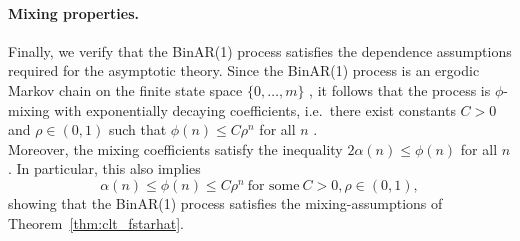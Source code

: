 ﻿\documentclass[12pt,a4paper]{scrreprt}
\theoremstyle{definition}
\begin{document}
\paragraph{Mixing properties.}
Finally, we verify that the BinAR(1) process satisfies the dependence 
assumptions required for the asymptotic theory. Since the BinAR(1) process 
is an ergodic Markov chain on the finite state space $\{0,\ldots,m\}$ 
\citep[p.~60]{Weiss2018}, it follows that the process is $\phi$-mixing 
with exponentially decaying coefficients, i.e.\ there exist constants 
$C > 0$ and $\rho \in (0,1)$ such that $\phi(n) \le C \rho^n$ for all $n$ 
\citep[Appendix~B.2.2]{Weiss2018}. \\
Moreover, the mixing coefficients satisfy the inequality 
$2\alpha(n) \le \phi(n)$ for all $n$ \citep[Eq.~(1.11)]{bradley_2005}. In particular, this also implies
\[\alpha(n) \leq \phi(n) \leq C \rho^n ~ \text{for some} ~ C > 0, \rho \in (0,1),\]
showing that the BinAR(1) process satisfies the mixing-assumptions of Theorem~\ref{thm:clt_fstarhat}.
\end{document}
